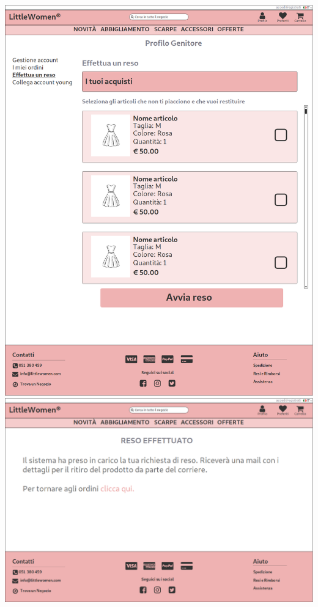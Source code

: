 \documentclass[12pt,a4paper]{report}
\begin{document}
\includegraphics[width=\textwidth]{"Project Management Sources/Wireframe/WireFrame Screenshot/Desktop/17 - Profilo Reso"}
\includegraphics[width=\textwidth]{"Project Management Sources/Wireframe/WireFrame Screenshot/Desktop/18 - Reso Effettuato"}
\end{document}
